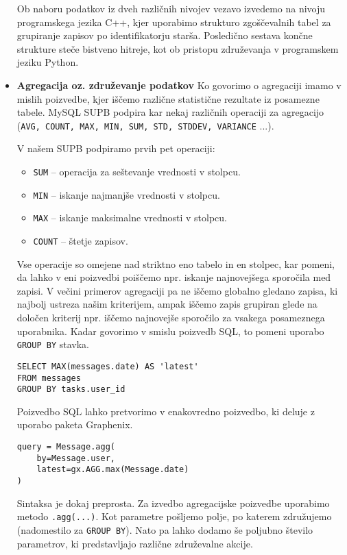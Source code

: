 \documentclass[a4paper,12pt,openright]{book}
\begin{document}
\begin{itemize}
        Ob naboru podatkov iz dveh različnih nivojev vezavo izvedemo na nivoju programskega jezika C++, kjer uporabimo strukturo zgoščevalnih tabel za grupiranje zapisov po identifikatorju starša. Posledično sestava končne strukture steče bistveno hitreje, kot ob pristopu združevanja v programskem jeziku Python.

        \item \textbf{Agregacija oz. združevanje podatkov}
        \newline
        \noindent
        Ko govorimo o agregaciji imamo v mislih poizvedbe, kjer iščemo različne statistične rezultate iz posamezne tabele. MySQL SUPB podpira kar nekaj različnih operaciji za agregacijo \cite{MYSQL_AGG} ({\tt AVG, COUNT, MAX, MIN, SUM, STD, STDDEV, VARIANCE} ...).

        V našem SUPB podpiramo prvih pet operaciji:
        
        \begin{itemize}
            \item {\tt SUM} – operacija za seštevanje vrednosti v stolpcu.
            \item {\tt MIN} – iskanje najmanjše vrednosti v stolpcu.
            \item {\tt MAX} – iskanje maksimalne vrednosti v stolpcu.
            \item {\tt COUNT} – štetje zapisov.
        \end{itemize}

        Vse operacije so omejene nad striktno eno tabelo in en stolpec, kar pomeni, da lahko v eni poizvedbi poiščemo npr. iskanje najnovejšega sporočila med zapisi. V večini primerov agregaciji pa ne iščemo globalno gledano zapisa, ki najbolj ustreza našim kriterijem, ampak iščemo zapis grupiran glede na določen kriterij npr. iščemo najnovejše sporočilo za vsakega posameznega uporabnika. Kadar govorimo v smislu poizvedb SQL, to pomeni uporabo {\tt GROUP BY} stavka.

\begin{verbatim}
SELECT MAX(messages.date) AS 'latest' 
FROM messages
GROUP BY tasks.user_id
\end{verbatim}

        \noindent
        Poizvedbo SQL lahko pretvorimo v enakovredno poizvedbo, ki deluje z uporabo paketa Graphenix.

\begin{verbatim}
query = Message.agg(
    by=Message.user, 
    latest=gx.AGG.max(Message.date)
)
\end{verbatim}

        \noindent
        Sintaksa je dokaj preprosta. Za izvedbo agregacijske poizvedbe uporabimo metodo {\tt .agg(...)}. Kot parametre pošljemo polje, po katerem združujemo (nadomestilo za {\tt GROUP BY}). Nato pa lahko dodamo še poljubno število parametrov, ki predstavljajo različne združevalne akcije.
\end{itemize}
\end{document}
